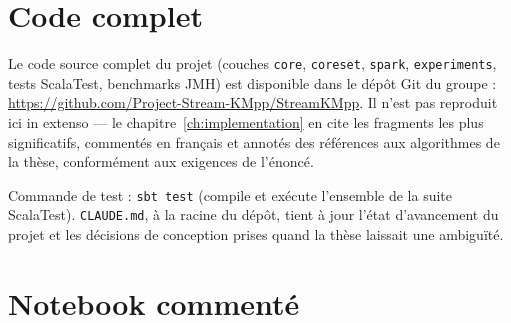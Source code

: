 \appendix

\chapter{Code complet}
\label{ap:code}

Le code source complet du projet (couches \texttt{core}, \texttt{coreset},
\texttt{spark}, \texttt{experiments}, tests ScalaTest, benchmarks JMH) est
disponible dans le dépôt Git du groupe :
\url{https://github.com/Project-Stream-KMpp/StreamKMpp}. Il n'est pas
reproduit ici in extenso --- le chapitre~\ref{ch:implementation} en cite les
fragments les plus significatifs, commentés en français et annotés des
références aux algorithmes de la thèse, conformément aux exigences de
l'énoncé.

Commande de test : \texttt{sbt test} (compile et exécute l'ensemble de la
suite ScalaTest). \texttt{CLAUDE.md}, à la racine du dépôt, tient à jour
l'état d'avancement du projet et les décisions de conception prises quand la
thèse laissait une ambiguïté.

\chapter{Notebook commenté}
\label{ap:notebook}

